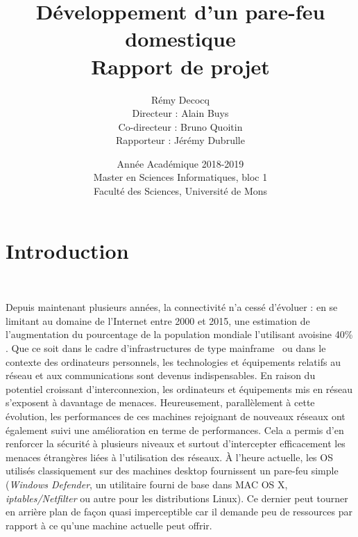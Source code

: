 \documentclass[]{article}
\begin{document}
\title{
\vspace{1.6cm}
{\Huge Développement d'un pare-feu domestique}\\
\vspace{0.5cm}
{\Huge Rapport de projet}\\
}



\author{
\vspace{0.9cm}
\huge{Rémy Decocq}\\
\large{Directeur : Alain Buys}\\
\large{Co-directeur : Bruno Quoitin}\\
\large{Rapporteur : Jérémy Dubrulle}
}

\date{
\vspace{8.5cm}
Année Académique 2018-2019\\
Master en Sciences Informatiques, bloc 1\\
Faculté des Sciences, Université de Mons}

\maketitle          

\thispagestyle{empty}   

\newpage

\tableofcontents
\newpage

\section*{Introduction}
~\\
\par Depuis maintenant plusieurs années, la connectivité n'a cessé d'évoluer : en se limitant au domaine de l'Internet entre 2000 et 2015, une estimation de l'augmentation du pourcentage de la population mondiale l'utilisant avoisine 40\%  \cite{IWS} \cite{Cable}. Que ce soit dans le cadre d'infrastructures de type \og mainframe \fg \ ou dans le contexte des ordinateurs personnels, les technologies et équipements relatifs au réseau et aux communications sont devenus indispensables. En raison du potentiel croissant d'interconnexion, les ordinateurs et équipements mis en réseau s'exposent à davantage de menaces. Heureusement, parallèlement à cette évolution, les performances de ces machines rejoignant de nouveaux réseaux ont également suivi une amélioration en terme de performances. Cela a permis d'en renforcer la sécurité à plusieurs niveaux et surtout d'intercepter efficacement les menaces étrangères liées à l'utilisation des réseaux. À l'heure actuelle, les OS utilisés classiquement sur des machines desktop fournissent un pare-feu simple (\textit{Windows Defender}, un utilitaire fourni de base dans MAC OS X, \textit{iptables/Netfilter} ou autre pour les distributions Linux). Ce dernier peut tourner en arrière plan de façon quasi imperceptible car il demande peu de ressources par rapport à ce qu'une machine actuelle peut offrir.\\
\end{document}
